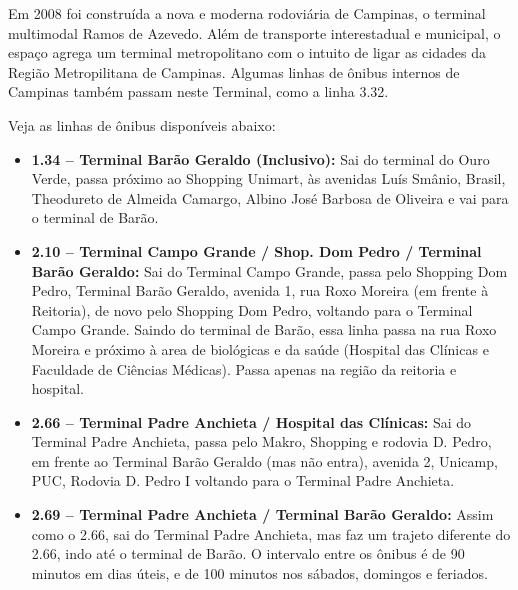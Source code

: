 Em 2008 foi construída a nova e moderna rodoviária de Campinas, o terminal
multimodal Ramos de Azevedo. Além de transporte interestadual e municipal,
o espaço agrega um terminal metropolitano com o intuito de ligar as cidades da
Região Metropilitana de Campinas. Algumas linhas de ônibus internos de Campinas
também passam neste Terminal, como a linha 3.32.

Veja as linhas de ônibus disponíveis abaixo:

\begin{itemize}
\item  \textbf{1.34 -- Terminal Barão Geraldo (Inclusivo):} Sai do terminal do Ouro Verde, passa próximo ao Shopping Unimart, às avenidas Luís Smânio, Brasil, Theodureto de Almeida Camargo, Albino José Barbosa de Oliveira e vai para o terminal de Barão.
\end{itemize}

\begin{itemize}
\item  \textbf{2.10 -- Terminal Campo Grande / Shop. Dom Pedro / Terminal Barão Geraldo:} Sai do Terminal Campo Grande, passa pelo Shopping Dom Pedro, Terminal Barão Geraldo, avenida 1, rua Roxo Moreira (em frente à Reitoria), de novo pelo Shopping Dom Pedro, voltando para o Terminal Campo Grande. Saindo do terminal de Barão, essa linha passa na rua Roxo Moreira e próximo à area de biológicas e da saúde (Hospital das Clínicas e Faculdade de Ciências Médicas). Passa apenas na região da reitoria e hospital.
\end{itemize}

\begin{itemize}
\item  \textbf{2.66 -- Terminal Padre Anchieta / Hospital das Clínicas:} Sai do Terminal Padre Anchieta, passa pelo Makro, Shopping e rodovia D. Pedro, em frente ao Terminal Barão Geraldo (mas não entra), avenida 2, Unicamp, PUC, Rodovia D. Pedro I voltando para o Terminal Padre Anchieta.
\end{itemize}

\begin{itemize}
\item  \textbf{2.69 -- Terminal Padre Anchieta / Terminal Barão Geraldo:} Assim como o 2.66, sai do Terminal Padre Anchieta, mas faz um trajeto diferente do 2.66, indo até o terminal de Barão. O intervalo entre os ônibus é de 90 minutos em dias úteis, e de 100 minutos nos sábados, domingos e feriados.
\end{itemize}

